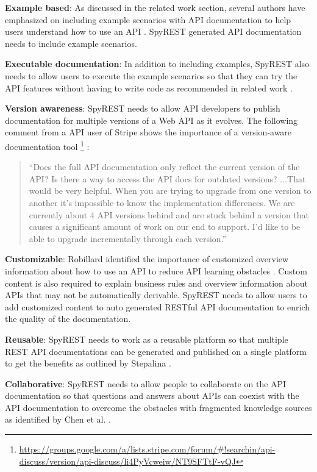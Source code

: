 \documentclass[conference]{IEEEtran}
\begin{document}
  \textbf{Example based}: As discussed in the related work section, several authors have emphasized on including example scenarios with API documentation to help users understand how to use an API \cite{Robillard_what_makes} \cite{Kuhn_on_designing} \cite{Hoffman_api_documentation} \cite{Nasehi_what_makes}. SpyREST generated API documentation needs to include example scenarios.

  \textbf{Executable documentation}: In addition to including examples, SpyREST also needs to allow users to execute the example scenarios so that they can try the API features without having to write code as recommended in related work \cite{Hoffman_api_documentation} \cite{Myers_study}.

  \textbf{Version awareness}: SpyREST needs to allow API developers to publish documentation for multiple versions of a Web API as it evolves. The following comment from a API user of Stripe shows the importance of a version-aware documentation tool \footnote{\url{https://groups.google.com/a/lists.stripe.com/forum/#!searchin/api-discuss/version/api-discuss/li4PyVcweiw/NT9SFTtF-vQJ}}
:
  \small
  \begin{quotation}
   ``Does the full API documentation only reflect the current version of the
    API?  Is there a way to access the API docs for outdated versions? ...That would be very helpful. When you are trying to upgrade from one version to another it's impossible to know the implementation differences. We are currently about 4 API versions behind and are stuck behind a version that causes a significant amount of work on our end to support. I'd like to be able to upgrade incrementally through each version.''
  \end{quotation}
  \normalsize

  \textbf{Customizable}: Robillard identified the importance of customized overview information about how to use an API to reduce API learning obstacles \cite{Robillard_what_makes}. Custom content is also required to explain business rules and overview information about APIs that may not be automatically derivable. SpyREST needs to allow users to add customized content to auto generated RESTful API documentation to enrich the quality of the documentation.

  \textbf{Reusable}: SpyREST needs to work as a reusable platform so that multiple REST API documentations can be generated and published on a single platform to get the benefits as outlined by Stepalina \cite{Stepalina_saas}.

  \textbf{Collaborative}: SpyREST needs to allow people to collaborate on the API documentation so that questions and answers about APIs can coexist with the API documentation to overcome the obstacles with fragmented knowledge sources as identified by Chen et al. \cite{Chen_who_asked}.
\end{document}
